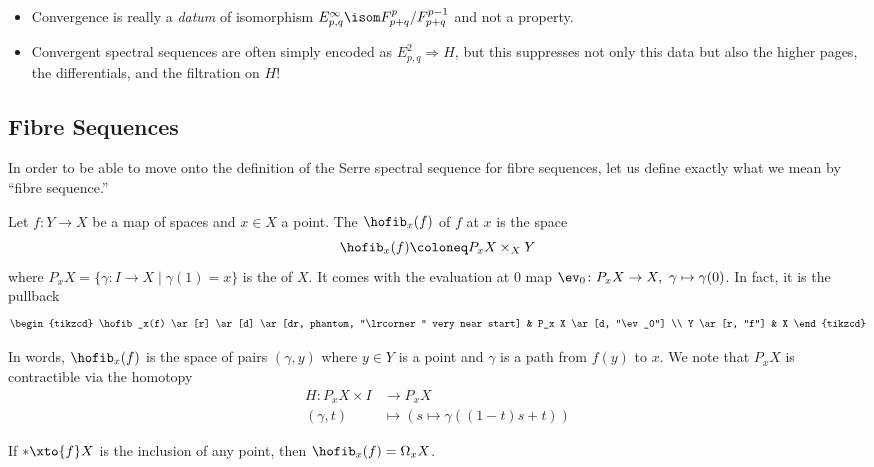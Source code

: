\begin{remark}
	\leavevmode
	\begin{itemize}
		\item Convergence is really a \emph{datum} of isomorphism $E^\infty_{p, q} \isom F^p_{p + q} / F^{p - 1}_{p + q}$ and not a property.
		\item Convergent spectral sequences are often simply encoded as $E^2_{p, q} \Rightarrow H$, but this suppresses not only this data but also the higher pages, the differentials, and the filtration on $H$!
	\end{itemize}
\end{remark}

\subsection{Fibre Sequences}
In order to be able to move onto the definition of the Serre spectral sequence for fibre sequences, let us define exactly what we mean by \enquote{fibre sequence.}
\begin{definition}
	Let $f\colon Y \to X$ be a map of spaces and $x \in X$ a point.
	The  $\hofib_x(f)$ of $f$ at $x$ is the space
	\begin{equation*}
		\hofib_x(f) \coloneq P_x X \times_X Y
	\end{equation*}
	where $P_x X = \{\gamma\colon I \to X \mid \gamma(1) = x\}$ is the  of $X$.
	It comes with the evaluation at 0 map $\ev_0\colon P_x X \to X,\ \gamma \mapsto \gamma(0)$.
	In fact, it is the pullback
	\begin{equation*}
		\begin{tikzcd}
			\hofib_x(f)
					\ar[r]
					\ar[d]
					\ar[dr, phantom, "\lrcorner" very near start]
				& P_x X
					\ar[d, "\ev_0"]
			\\
			Y 
					\ar[r, "f"]
				& X
		\end{tikzcd}
	\end{equation*}
\end{definition}
In words, $\hofib_x(f)$ is the space of pairs $(\gamma, y)$ where $y \in Y$ is a point and $\gamma$ is a path from $f(y)$ to $x$.
We note that $P_x X$ is contractible via the homotopy
\begin{align*}
	H\colon P_x X \times I &\to P_x X \\
	(\gamma, t) &\mapsto (s \mapsto \gamma((1 - t)s + t))
\end{align*}
\begin{example}
	If $* \xto{f} X$ is the inclusion of any point, then $\hofib_x(f) = \Omega_x X$.
\end{example}
